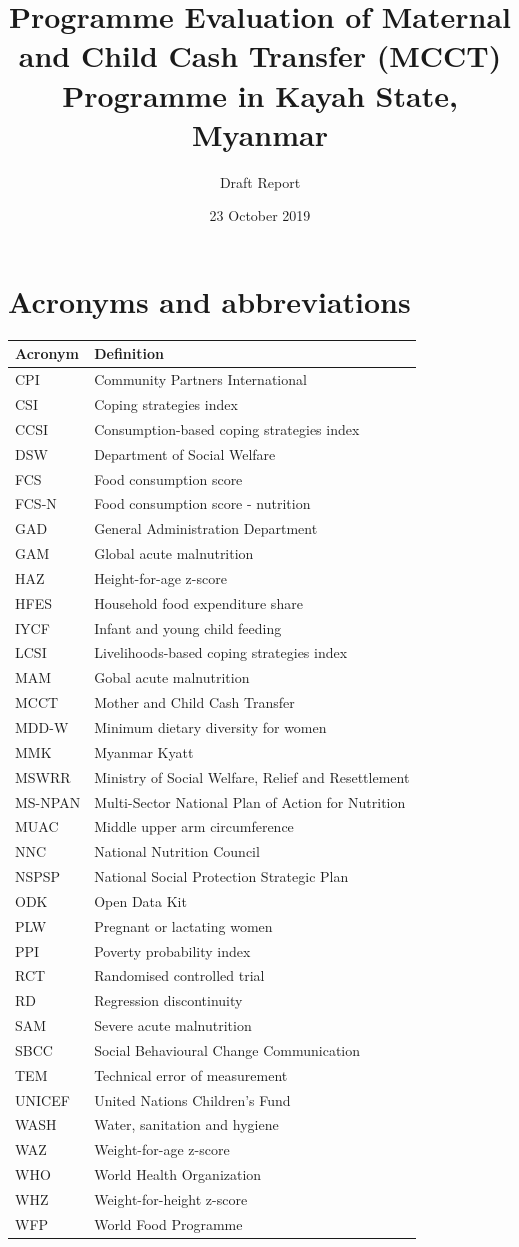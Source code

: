 \documentclass[12pt,a4paper]{article}
\title{\vspace{8cm} \LARGE{Programme Evaluation of Maternal and Child Cash Transfer (MCCT) Programme in Kayah State, Myanmar}}
\subtitle{Draft Report}
\author{}
\date{23 October 2019}
\begin{document}
\maketitle

\newpage

{
\hypersetup{linkcolor=black}
\setcounter{tocdepth}{3}
\tableofcontents
}
\listoftables
\listoffigures
\newpage

\hypertarget{acronyms-and-abbreviations}{%
\section*{Acronyms and abbreviations}\label{acronyms-and-abbreviations}}

\begin{longtable}[]{@{}ll@{}}
\toprule
Acronym & Definition\tabularnewline
\midrule
\endhead
CPI & Community Partners International\tabularnewline
CSI & Coping strategies index\tabularnewline
CCSI & Consumption-based coping strategies index\tabularnewline
DSW & Department of Social Welfare\tabularnewline
FCS & Food consumption score\tabularnewline
FCS-N & Food consumption score - nutrition\tabularnewline
GAD & General Administration Department\tabularnewline
GAM & Global acute malnutrition\tabularnewline
HAZ & Height-for-age z-score\tabularnewline
HFES & Household food expenditure share\tabularnewline
IYCF & Infant and young child feeding\tabularnewline
LCSI & Livelihoods-based coping strategies index\tabularnewline
MAM & Gobal acute malnutrition\tabularnewline
MCCT & Mother and Child Cash Transfer\tabularnewline
MDD-W & Minimum dietary diversity for women\tabularnewline
MMK & Myanmar Kyatt\tabularnewline
MSWRR & Ministry of Social Welfare, Relief and Resettlement\tabularnewline
MS-NPAN & Multi-Sector National Plan of Action for Nutrition\tabularnewline
MUAC & Middle upper arm circumference\tabularnewline
NNC & National Nutrition Council\tabularnewline
NSPSP & National Social Protection Strategic Plan\tabularnewline
ODK & Open Data Kit\tabularnewline
PLW & Pregnant or lactating women\tabularnewline
PPI & Poverty probability index\tabularnewline
RCT & Randomised controlled trial\tabularnewline
RD & Regression discontinuity\tabularnewline
SAM & Severe acute malnutrition\tabularnewline
SBCC & Social Behavioural Change Communication\tabularnewline
TEM & Technical error of measurement\tabularnewline
UNICEF & United Nations Children's Fund\tabularnewline
WASH & Water, sanitation and hygiene\tabularnewline
WAZ & Weight-for-age z-score\tabularnewline
WHO & World Health Organization\tabularnewline
WHZ & Weight-for-height z-score\tabularnewline
WFP & World Food Programme\tabularnewline
\bottomrule
\end{longtable}
\end{document}
